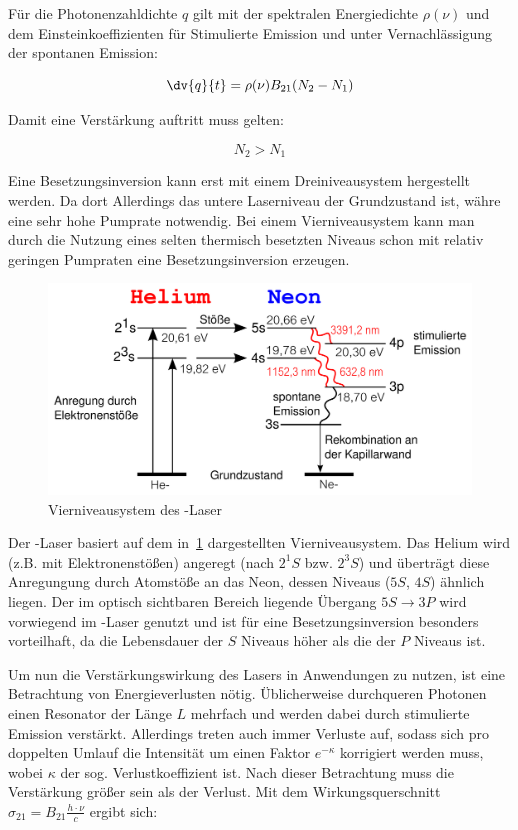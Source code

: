 \documentclass[slug=GL, room=HZDR\ Dresden/Rossendorf\,\ Geb.\ 620/123, supervisor=Tim\ Ziegler]{../../Lab_Report_LaTeX/lab_report}
\newcommand{\hne}{\ce{HeNe}-Laser}
\begin{document}
F\"ur die Photonenzahldichte \(q\) gilt mit der spektralen
Energiedichte \(\rho(\nu)\) und dem Einsteinkoeffizienten f\"ur
Stimulierte Emission und unter Vernachl\"assigung der spontanen
Emission:

\begin{equation}
  \label{eq:qrate}
  \dv{q}{t}=\rho(\nu)B_{21}(N_2-N_1)
\end{equation}

Damit eine Verst\"arkung auftritt muss gelten:

\begin{equation}
  \label{eq:first}
  \tag{Erste Laserbedingung}
  N_2>N_1
\end{equation}

Eine Besetzungsinversion kann erst mit einem Dreiniveausystem
hergestellt werden. Da dort Allerdings das untere Laserniveau der
Grundzustand ist, w\"ahre eine sehr hohe Pumprate notwendig. Bei einem
Vierniveausystem kann man durch die Nutzung eines selten thermisch
besetzten Niveaus schon mit relativ geringen Pumpraten eine
Besetzungsinversion erzeugen.

\begin{figure}[H]\centering
  \includegraphics[width=.8\columnwidth]{heneniv.png}
  \caption[Aufbau]{Vierniveausystem des \hne{}}
  \label{fig:niveaus}
\end{figure}

Der \hne{} basiert auf dem in~\ref{fig:niveaus} dargestellten
Vierniveausystem. Das Helium wird (z.B. mit Elektronenst\"o\ss{}en)
angeregt (nach \(2^1S\) bzw. \(2^3S\)) und \"ubertr\"agt diese
Anregungung durch Atomst\"o\ss{}e an das Neon, dessen Niveaus (\(5S\),
\(4S\)) \"ahnlich liegen. Der im optisch sichtbaren Bereich liegende
\"Ubergang \(5S\rightarrow 3P\) wird vorwiegend im \hne{} genutzt und
ist f\"ur eine Besetzungsinversion besonders vorteilhaft, da die
Lebensdauer der \(S\) Niveaus h\"oher als die der \(P\) Niveaus ist.


Um nun die Verst\"arkungswirkung des Lasers in Anwendungen zu nutzen,
ist eine Betrachtung von Energieverlusten n\"otig. \"Ublicherweise
durchqueren Photonen einen Resonator der L\"ange \(L\) mehrfach und
werden dabei durch stimulierte Emission verst\"arkt. Allerdings treten
auch immer Verluste auf, sodass sich pro doppelten Umlauf die
Intensit\"at um einen Faktor \(e^{-\kappa}\) korrigiert werden muss,
wobei \(\kappa\) der sog. Verlustkoeffizient ist. Nach dieser
Betrachtung muss die Verst\"arkung gr\"o\ss{}er sein als der Verlust.
Mit dem Wirkungsquerschnitt \(\sigma_{21}=B_{21}\frac{h\cdot\nu}{c}\)
ergibt sich:
\end{document}
